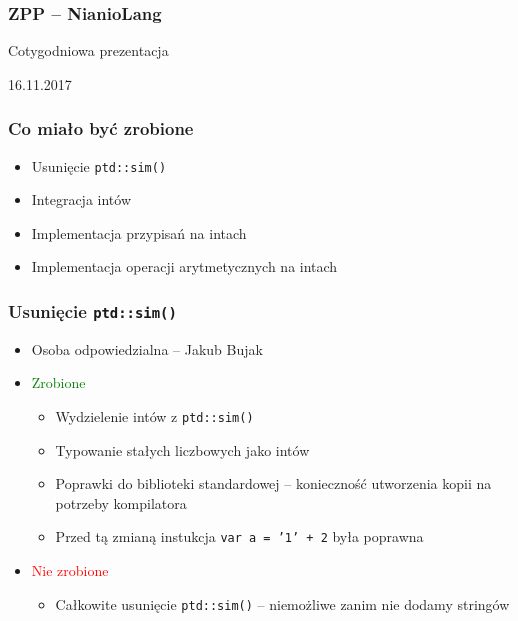 \documentclass{beamer}
\begin{document}
	\begin{frame}
		\frametitle{ZPP -- NianioLang}
		Cotygodniowa prezentacja
		
		16.11.2017
	\end{frame}
	
	\begin{frame}
		\frametitle{Co miało być zrobione}
		\begin{itemize}
		 \item Usunięcie \texttt{ptd::sim()}
		 \item Integracja intów
		 \item Implementacja przypisań na intach
		 \item Implementacja operacji arytmetycznych na intach
		\end{itemize}
	\end{frame}
	
	\begin{frame}
		\frametitle{Usunięcie \texttt{ptd::sim()}}
		\begin{itemize}
			\item Osoba odpowiedzialna -- Jakub Bujak
			\item\textcolor{green}{Zrobione}
			\begin{itemize}
				\item Wydzielenie intów z \texttt{ptd::sim()}
				\item Typowanie stałych liczbowych jako intów
				\item Poprawki do biblioteki standardowej -- konieczność utworzenia kopii na potrzeby kompilatora
				\item Przed tą zmianą instukcja \texttt{var a = '1' + 2} była poprawna
			\end{itemize}
			\item\textcolor{red}{Nie zrobione}
			\begin{itemize}
				\item Całkowite usunięcie \texttt{ptd::sim()} -- niemożliwe zanim nie dodamy stringów
			\end{itemize}

		\end{itemize}
	\end{frame}
	
\end{document}
